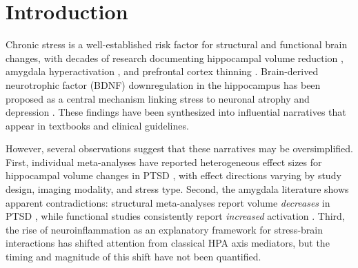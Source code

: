 \documentclass[12pt,a4paper]{article}
\begin{document}
\begin{abstract}
\textbf{Conclusions.} Large-scale LLM-powered extraction reveals quantitative complexities hidden within established stress-brain narratives. The ``BDNF always decreases'' and ``amygdala always increases'' simplicities do not survive metric-separated, temporally resolved analysis. These findings provide an evidence-based roadmap for future research priorities and demonstrate the utility of LLM-based systematic extraction as a complement to traditional meta-analysis. The complete extraction dataset (9,585 entries) is available at \url{https://huggingface.co/datasets/shoo99/KBRI} under CC-BY-4.0.

\medskip
\noindent\textbf{Keywords:} chronic stress, brain structure, BDNF, neuroinflammation, HPA axis, hippocampus, amygdala, LLM, NLP, systematic review, meta-analysis
\end{abstract}

\section{Introduction}

Chronic stress is a well-established risk factor for structural and functional brain changes, with decades of research documenting hippocampal volume reduction \citep{mcewen1999,lupien2009}, amygdala hyperactivation \citep{vyas2002}, and prefrontal cortex thinning \citep{arnsten2009}. Brain-derived neurotrophic factor (BDNF) downregulation in the hippocampus has been proposed as a central mechanism linking stress to neuronal atrophy and depression \citep{duman2006}. These findings have been synthesized into influential narratives that appear in textbooks and clinical guidelines.

However, several observations suggest that these narratives may be oversimplified. First, individual meta-analyses have reported heterogeneous effect sizes for hippocampal volume changes in PTSD \citep{odoherty2015}, with effect directions varying by study design, imaging modality, and stress type. Second, the amygdala literature shows apparent contradictions: structural meta-analyses report volume \textit{decreases} in PTSD \citep{odoherty2015}, while functional studies consistently report \textit{increased} activation \citep{shin2006}. Third, the rise of neuroinflammation as an explanatory framework for stress-brain interactions \citep{miller2016,wohleb2016} has shifted attention from classical HPA axis mediators, but the timing and magnitude of this shift have not been quantified.
\end{document}
